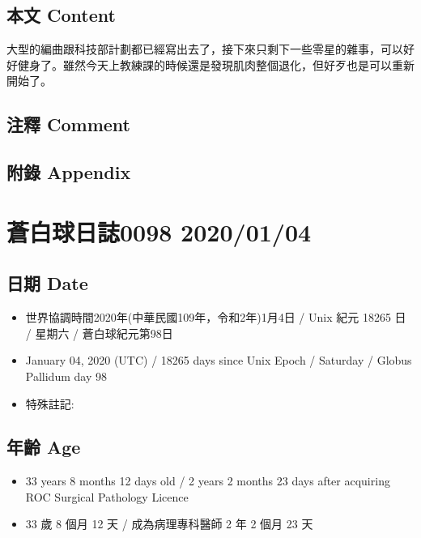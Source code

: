 \documentclass[a5paper, 12pt
]{book}
\providecommand{\tightlist}{%
  \setlength{\itemsep}{0pt}\setlength{\parskip}{0pt}}
\begin{document}
\hypertarget{ux672cux6587-content-33}{%
\subsection{本文 Content}\label{ux672cux6587-content-33}}

大型的編曲跟科技部計劃都已經寫出去了，接下來只剩下一些零星的雜事，可以好好健身了。雖然今天上教練課的時候還是發現肌肉整個退化，但好歹也是可以重新開始了。

\hypertarget{ux6ce8ux91cb-comment-32}{%
\subsection{注釋 Comment}\label{ux6ce8ux91cb-comment-32}}

\hypertarget{ux9644ux9304-appendix-33}{%
\subsection{附錄 Appendix}\label{ux9644ux9304-appendix-33}}

\hypertarget{ux84bcux767dux7403ux65e5ux8a8c0098-20200104}{%
\section{蒼白球日誌0098
2020/01/04}\label{ux84bcux767dux7403ux65e5ux8a8c0098-20200104}}

\hypertarget{ux65e5ux671f-date-34}{%
\subsection{日期 Date}\label{ux65e5ux671f-date-34}}

\begin{itemize}
\tightlist
\item
  世界協調時間2020年(中華民國109年，令和2年)1月4日 / Unix 紀元 18265 日
  / 星期六 / 蒼白球紀元第98日
\item
  January 04, 2020 (UTC) / 18265 days since Unix Epoch / Saturday /
  Globus Pallidum day 98
\item
  特殊註記:
\end{itemize}

\hypertarget{ux5e74ux9f61-age-34}{%
\subsection{年齡 Age}\label{ux5e74ux9f61-age-34}}

\begin{itemize}
\tightlist
\item
  33 years 8 months 12 days old / 2 years 2 months 23 days after
  acquiring ROC Surgical Pathology Licence
\item
  33 歲 8 個月 12 天 / 成為病理專科醫師 2 年 2 個月 23 天
\end{itemize}
\end{document}
